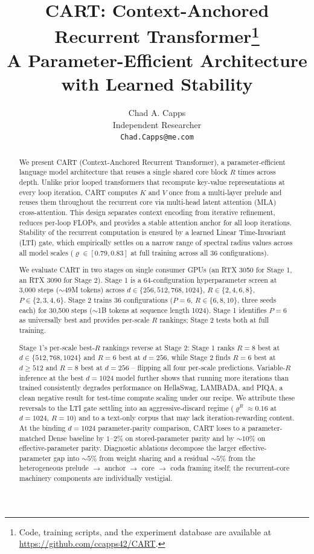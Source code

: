 \documentclass{article}
\title{CART: Context-Anchored Recurrent Transformer\thanks{Code, training scripts, and the experiment database are available at \url{https://github.com/ccapps42/CART}.}\\
A Parameter-Efficient Architecture with Learned Stability}
\author{%
  Chad A. Capps\\
  Independent Researcher\\
  \texttt{Chad.Capps@me.com}
}
\newcommand{\cart}{\textsc{CART}}
\begin{document}
\maketitle

\begin{abstract}
We present \cart{} (Context-Anchored Recurrent Transformer), a parameter-efficient language model architecture that reuses a single shared core block $R$ times across depth. Unlike prior looped transformers that recompute key-value representations at every loop iteration, \cart{} computes $K$ and $V$ once from a multi-layer prelude and reuses them throughout the recurrent core via multi-head latent attention (MLA) cross-attention. This design separates context encoding from iterative refinement, reduces per-loop FLOPs, and provides a stable attention anchor for all loop iterations. Stability of the recurrent computation is ensured by a learned Linear Time-Invariant (LTI) gate, which empirically settles on a narrow range of spectral radius values across all model scales ($\varrho \in [0.79, 0.83]$ at full training across all 36 configurations).

We evaluate \cart{} in two stages on single consumer GPUs (an RTX 3050 for Stage 1, an RTX 3090 for Stage 2). Stage 1 is a 64-configuration hyperparameter screen at 3{,}000 steps ($\sim$49M tokens) across $d \in \{256, 512, 768, 1024\}$, $R \in \{2, 4, 6, 8\}$, $P \in \{2, 3, 4, 6\}$. Stage 2 trains 36 configurations ($P{=}6$, $R \in \{6, 8, 10\}$, three seeds each) for 30{,}500 steps ($\sim$1B tokens at sequence length 1024). Stage 1 identifies $P{=}6$ as universally best and provides per-scale $R$ rankings; Stage 2 tests both at full training.

Stage 1's per-scale best-$R$ rankings reverse at Stage 2: Stage 1 ranks $R{=}8$ best at $d \in \{512, 768, 1024\}$ and $R{=}6$ best at $d{=}256$, while Stage 2 finds $R{=}6$ best at $d \geq 512$ and $R{=}8$ best at $d{=}256$ -- flipping all four per-scale predictions. Variable-$R$ inference at the best $d{=}1024$ model further shows that running more iterations than trained consistently degrades performance on HellaSwag, LAMBADA, and PIQA, a clean negative result for test-time compute scaling under our recipe. We attribute these reversals to the LTI gate settling into an aggressive-discard regime ($\varrho^R \approx 0.16$ at $d{=}1024$, $R{=}10$) and to a text-only corpus that may lack iteration-rewarding content. At the binding $d{=}1024$ parameter-parity comparison, \cart{} loses to a parameter-matched Dense baseline by $1$--$2\%$ on stored-parameter parity and by $\sim 10\%$ on effective-parameter parity. Diagnostic ablations decompose the larger effective-parameter gap into $\sim 5\%$ from weight sharing and a residual $\sim 5\%$ from the heterogeneous prelude $\to$ anchor $\to$ core $\to$ coda framing itself; the recurrent-core machinery components are individually vestigial.
\end{abstract}
\end{document}
